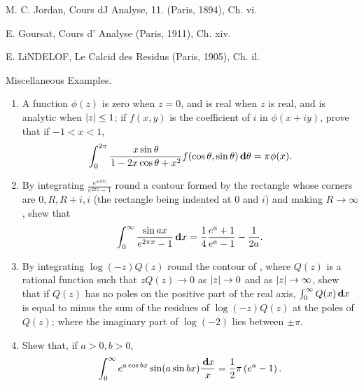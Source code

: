 M. C. Jordan, Cours dJ Analyse, 11. (Paris, 1894), Ch. vi.

E. Goursat, Cours d' Analyse (Paris, 1911), Ch. xiv.

E. LiNDELOF, Le Calcid des Residus (Paris, 1905), Ch. il.

%
%

Miscellaneous Examples.
\begin{enumerate}
\item  A function $\phi(z)$ is zero when $z=0$, and is real when $z$
  is real, and is analytic when $\left| z \right| \leq 1$; if $f(x,y)$ is
  the coefficient of $i$ in $\phi(x + iy)$, prove that if $-1 < x < 1$,
  $$
  \int_{0}^{2\pi}
  \frac{x \sin\theta }{ 1 - 2x\cos\theta + x^{2}}
  f(\cos\theta, \sin\theta)
  \, \mathbf{d}\theta
  =
  \pi \phi(x).
  $$
\item
  By integrating $\frac{e^{\pm aiz}}{e^{2\pi z}-1}$ round a contour formed by the rectangle whose
  corners are $0, R, R+i, i$ (the rectangle being indented at $0$ and
  $i$) and making $R\rightarrow\infty$,
  shew that
  $$
  \int_{0}^{\infty}
  \frac{ \sin ax }{e^{2 \pi x} - 1}
  \, \mathbf{d} x
  =
  \frac{1}{4}
  \frac{ e^{a} + 1 }{ e^{a} - 1 }
  -
  \frac{1}{2a}.
  $$

\item
  By integrating $\log (-z) Q(z)$ round the contour of
  , where $Q(z)$ is a rational function such
  that  $z Q(z) \rightarrow 0$ as $\left| z \right| \rightarrow 0$ and as
  $\left| z \right| \rightarrow \infty$, shew that if $Q(z)$ has no poles 
  on the positive part of the real axis,
  $\int_{0}^{\infty} Q(x) \, \mathbf{d} x$ is equal to minus
  the sum of the residues of $\log(-z) Q(z)$ at the poles of
  $Q(z)$; where the imaginary part of $\log(-2)$ lies between $\pm\pi$.

\item
  Shew that, if $a > 0, b > 0$,
  $$
  \int_{0}^{\infty}
  e^{a \cos bx} \sin (a \sin bx) \frac{\, \mathbf{d} x}{x}
  =
  \frac{1}{2} \pi \left(  e^{a} - 1  \right).
  $$


\end{enumerate}
